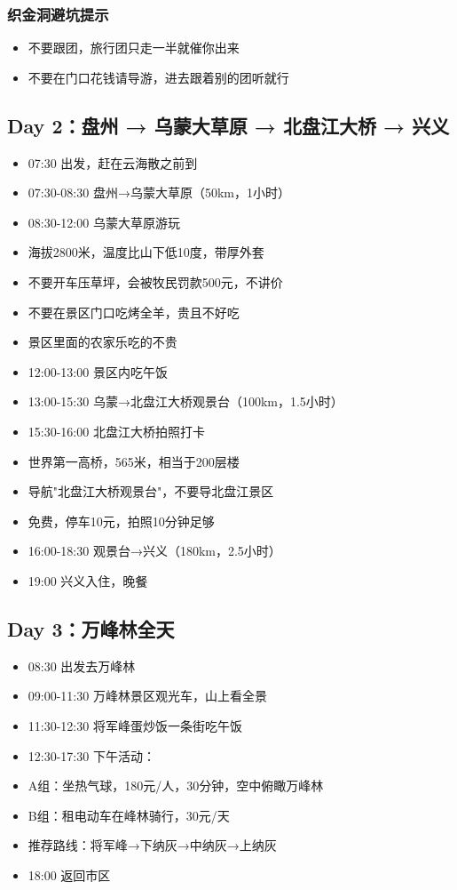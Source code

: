 \documentclass[12pt,a4paper,UTF8]{ctexart}
\begin{document}
\subsubsection{织金洞避坑提示}
\begin{itemize}
\item 不要跟团，旅行团只走一半就催你出来
\item 不要在门口花钱请导游，进去跟着别的团听就行
\end{itemize}

\subsection{Day 2：盘州 → 乌蒙大草原 → 北盘江大桥 → 兴义}
\begin{itemize}
\item 07:30 出发，赶在云海散之前到
\item 07:30-08:30 盘州→乌蒙大草原（50km，1小时）
\item 08:30-12:00 乌蒙大草原游玩
\item 海拔2800米，温度比山下低10度，带厚外套
\item 不要开车压草坪，会被牧民罚款500元，不讲价
\item 不要在景区门口吃烤全羊，贵且不好吃
\item 景区里面的农家乐吃的不贵
\item 12:00-13:00 景区内吃午饭
\item 13:00-15:30 乌蒙→北盘江大桥观景台（100km，1.5小时）
\item 15:30-16:00 北盘江大桥拍照打卡
\item 世界第一高桥，565米，相当于200层楼
\item 导航"北盘江大桥观景台"，不要导北盘江景区
\item 免费，停车10元，拍照10分钟足够
\item 16:00-18:30 观景台→兴义（180km，2.5小时）
\item 19:00 兴义入住，晚餐
\end{itemize}

\subsection{Day 3：万峰林全天}
\begin{itemize}
\item 08:30 出发去万峰林
\item 09:00-11:30 万峰林景区观光车，山上看全景
\item 11:30-12:30 将军峰蛋炒饭一条街吃午饭
\item 12:30-17:30 下午活动：
\item A组：坐热气球，180元/人，30分钟，空中俯瞰万峰林
\item B组：租电动车在峰林骑行，30元/天
\item 推荐路线：将军峰→下纳灰→中纳灰→上纳灰
\item 18:00 返回市区
\end{itemize}
\end{document}
